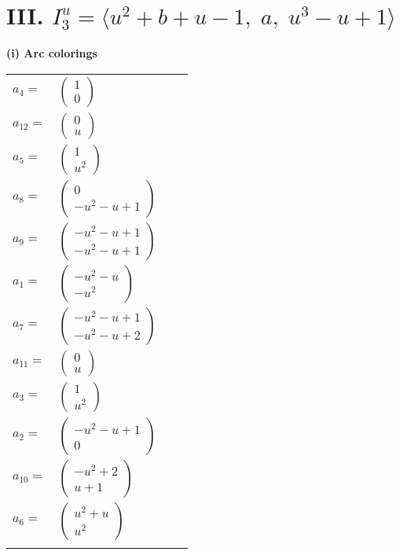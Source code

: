 \documentclass[1p]{elsarticle_modified}
\theoremstyle{definition}
\begin{document}
\centering \section*{III. $I^u_{3}= \langle u^2+b+u-1,\;a,\;u^3- u+1 \rangle$}
\flushleft \textbf{(i) Arc colorings}\\
\begin{tabular}{m{7pt} m{180pt} m{7pt} m{180pt} }
\flushright $a_{4}=$&$\begin{pmatrix}1\\0\end{pmatrix}$ \\
\flushright $a_{12}=$&$\begin{pmatrix}0\\u\end{pmatrix}$ \\
\flushright $a_{5}=$&$\begin{pmatrix}1\\u^2\end{pmatrix}$ \\
\flushright $a_{8}=$&$\begin{pmatrix}0\\- u^2- u+1\end{pmatrix}$ \\
\flushright $a_{9}=$&$\begin{pmatrix}- u^2- u+1\\- u^2- u+1\end{pmatrix}$ \\
\flushright $a_{1}=$&$\begin{pmatrix}- u^2- u\\- u^2\end{pmatrix}$ \\
\flushright $a_{7}=$&$\begin{pmatrix}- u^2- u+1\\- u^2- u+2\end{pmatrix}$ \\
\flushright $a_{11}=$&$\begin{pmatrix}0\\u\end{pmatrix}$ \\
\flushright $a_{3}=$&$\begin{pmatrix}1\\u^2\end{pmatrix}$ \\
\flushright $a_{2}=$&$\begin{pmatrix}- u^2- u+1\\0\end{pmatrix}$ \\
\flushright $a_{10}=$&$\begin{pmatrix}- u^2+2\\u+1\end{pmatrix}$ \\
\flushright $a_{6}=$&$\begin{pmatrix}u^2+u\\u^2\end{pmatrix}$\\&\end{tabular}
\end{document}
